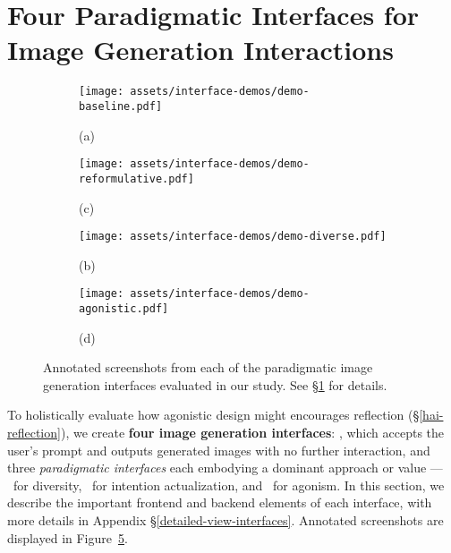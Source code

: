 \section{Four Paradigmatic Interfaces for Image Generation Interactions}
\label{paradigms-interfaces}


\begin{figure}[]
    \centering
    \begin{subfigure}[b]{0.35\textwidth}
        \centering
        \texttt{[image: assets/interface-demos/demo-baseline.pdf]}
        \caption*{(a) \baselinebox}
        \label{fig:image1}
    \end{subfigure}
    \hfill
    \begin{subfigure}[b]{0.64\textwidth}
        \centering
        \texttt{[image: assets/interface-demos/demo-reformulative.pdf]}
        \caption*{(c) }
        \label{fig:image3}
    \end{subfigure}
    \vspace{4mm}
    \begin{subfigure}[b]{0.35\textwidth}
        \centering
        \texttt{[image: assets/interface-demos/demo-diverse.pdf]}
        \caption*{(b) \diversebox}
        \label{fig:image2}
    \end{subfigure}
    \hfill
    \begin{subfigure}[b]{0.64\textwidth}
        \centering
        \texttt{[image: assets/interface-demos/demo-agonistic.pdf]}
        \caption*{(d) \agonisticbox}
        \label{fig:image4}
    \end{subfigure}
    \caption{Annotated screenshots from each of the paradigmatic image generation interfaces evaluated in our study. See \S\ref{paradigms-interfaces} for details.}
    \label{fig:interface-screenshots}
\end{figure}


To holistically evaluate how agonistic design might encourages reflection (\S\ref{hai-reflection}), we create \textbf{four image generation interfaces}: \baseline, which accepts the user's prompt and outputs generated images with no further interaction, and three \textit{paradigmatic interfaces} each embodying a dominant approach or value --- \diverse~for diversity, ~for intention actualization, and \agonistic~for agonism.
In this section, we describe the important frontend and backend elements of each interface, with more details in Appendix \S\ref{detailed-view-interfaces}. 
Annotated screenshots are displayed in Figure~\ref{fig:interface-screenshots}.


